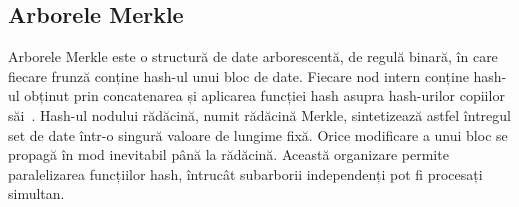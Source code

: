 \subsection{Arborele Merkle}

Arborele Merkle este o structură de date arborescentă, de regulă binară, în care fiecare frunză conține hash-ul unui bloc de date.
Fiecare nod intern conține hash-ul obținut prin concatenarea și aplicarea funcției hash asupra hash-urilor copiilor săi~\cite{merkle1989}.
Hash-ul nodului rădăcină, numit rădăcină Merkle, sintetizează astfel întregul set de date într-o singură valoare de lungime fixă.
Orice modificare a unui bloc se propagă în mod inevitabil până la rădăcină.
Această organizare permite paralelizarea funcțiilor hash, întrucât subarborii independenți pot fi procesați simultan. \\
